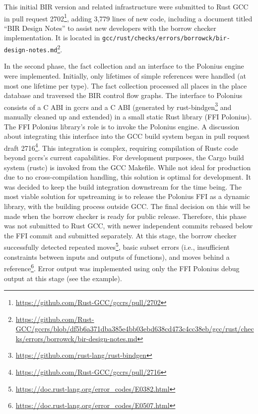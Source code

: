 \documentclass[
  11pt,
  twoside]{report}
\DeclareRobustCommand{\href}[2]{#2\footnote{\url{#1}}}
\begin{document}
This initial BIR version and related infrastructure were submitted to
Rust GCC in \href{https://github.com/Rust-GCC/gccrs/pull/2702}{pull
request 2702}, adding 3,779 lines of new code, including a document
titled ``BIR Design Notes'' to assist new developers with the borrow
checker implementation. It is located in
\href{https://github.com/Rust-GCC/gccrs/blob/df5b6a371dba385e4bb03ebd638cd473c4cc38eb/gcc/rust/checks/errors/borrowck/bir-design-notes.md}{\texttt{gcc/rust/checks/errors/borrowck/bir-design-notes.md}}.

In the second phase, the fact collection and an interface to the
Polonius engine were implemented. Initially, only lifetimes of simple
references were handled (at most one lifetime per type). The fact
collection processed all places in the place database and traversed the
BIR control flow graphs. The interface to Polonius consists of a C ABI
in gccrs and a C ABI (generated by
\href{https://github.com/rust-lang/rust-bindgen}{rust-bindgen} and
manually cleaned up and extended) in a small static Rust library (FFI
Polonius). The FFI Polonius library's role is to invoke the Polonius
engine. A discussion about integrating this interface into the GCC build
system began in \href{https://github.com/Rust-GCC/gccrs/pull/2716}{pull
request draft 2716}. This integration is complex, requiring compilation
of Rustc code beyond gccrs's current capabilities. For development
purposes, the Cargo build system (rustc) is invoked from the GCC
Makefile. While not ideal for production due to no cross-compilation
handling, this solution is optimal for development. It was decided to
keep the build integration downstream for the time being. The most
viable solution for upstreaming is to release the Polonius FFI as a
dynamic library, with the building process outside GCC. The final
decision on this will be made when the borrow checker is ready for
public release. Therefore, this phase was not submitted to Rust GCC,
with newer independent commits rebased below the FFI commit and
submitted separately. At this stage, the borrow checker successfully
detected
\href{https://doc.rust-lang.org/error_codes/E0382.html}{repeated moves},
basic subset errors (i.e., insufficient constraints between inputs and
outputs of functions), and
\href{https://doc.rust-lang.org/error_codes/E0507.html}{moves behind a
reference}. Error output was implemented using only the FFI Polonius
debug output at this stage (see the example).
\end{document}
